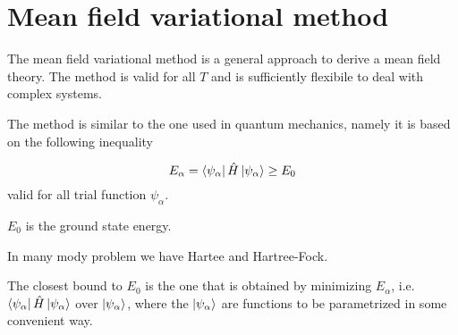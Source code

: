\documentclass[../main/main.tex]{subfiles}
\begin{document}
\section{Mean field variational method}
The mean field variational method is a general approach to derive a mean field theory. The method is valid for all \( T \) and is sufficiently flexibile to deal with complex systems.

 The method is similar to the one used in quantum mechanics, namely it is based on the following inequality

 \begin{equation}
   E_{\alpha } = \bra{\psi _ \alpha } \hat{H} \ket{\psi _ \alpha } \ge E_0
 \end{equation}
valid for all trial function \( \psi _ \alpha  \).
\begin{remark}
\( E_0 \) is the ground state energy.
\end{remark}
\begin{example}{}{}
In many mody problem we have Hartee and Hartree-Fock.
\end{example}
The closest bound to \( E_0 \) is the one that is obtained by minimizing \( E_ \alpha  \), i.e. \( \bra{\psi _ \alpha } \hat{H} \ket{\psi _ \alpha } \)  over \( \ket{\psi _ \alpha } \), where the \( \ket{\psi _ \alpha } \) are functions to be parametrized in some convenient way.
\end{document}
